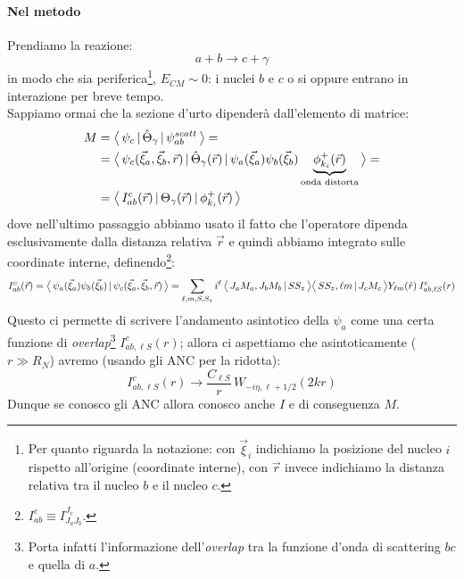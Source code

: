 \paragraph{Nel metodo}
Prendiamo la reazione:
$$a + b \to c+\gamma$$
in modo che sia periferica\footnote{Per quanto riguarda la notazione: con $\vec{\xi}_i$ indichiamo la posizione del nucleo $i$ rispetto all'origine (coordinate interne), con $\vec{r}$ invece indichiamo la distanza relativa tra il nucleo $b$ e il nucleo $c$.}, $E_{CM}\sim 0$: i nuclei $b$ e $c$ o si  oppure entrano in interazione per breve tempo.\\ 
Sappiamo ormai che la sezione d'urto dipenderà dall'elemento di matrice:
\begin{align*}
	M 
	&= \bigl\langle\, \psi_c\, |\,\hat{\Theta}_\gamma\, |\,\psi_{ab}^{scatt}\, \bigr\rangle =\\
	&= \bigl\langle\, \psi_c (\vec{\xi}_a,\vec{\xi}_b,\vec{r})\, |\,\hat{\Theta}_\gamma (	\vec{r})\, |\,\psi_{a}(\vec{\xi}_a)\psi_b(\vec{\xi}_b)\underbrace{\phi^+_{k_i}(\vec{r})}_\text{onda distorta}\, \bigr\rangle =\\ 
	&= \bigl\langle\, I_{ab}^c(\vec{r})\, |\,\Theta_\gamma(\vec{r})\, |\,\phi^+_{k_i}(\vec{r})\, \bigr\rangle
\end{align*}
dove nell'ultimo passaggio abbiamo usato il fatto che l'operatore dipenda esclusivamente dalla distanza relativa $\vec{r}$ e quindi abbiamo integrato sulle coordinate interne, definendo\footnote{$I_{ab}^c \equiv I_{J_a J_b}^{J_c}$.}:
$$
I_{ab}^c (\vec{r}) = \bigl\langle\, \psi_a(\vec{\xi}_a)\psi_b(\vec{\xi}_b)\, |\, \psi_c(\vec{\xi}_a,\vec{\xi}_b,\vec{r})\, \bigr\rangle = \sum_{\ell,m,S,S_z} i^\ell \, \bigl\langle\, J_a M_a,J_b M_b\, |\, SS_z\, \bigr\rangle \bigl\langle\, SS_z, \ell m\, |\, J_c M_c\, \bigr\rangle Y_{\ell m}(\hat{r})\:I_{ab,\ell S}^c (r)
$$
Questo ci permette di scrivere l'andamento asintotico della $\psi_a$ come una certa funzione di \textit{overlap}\footnote{Porta infatti l'informazione dell'\textit{overlap} tra la funzione d'onda di scattering $bc$ e quella di $a$.} $I_{ab,\ell S}^c (r)$; allora ci aspettiamo che asintoticamente ($r\gg R_N$) avremo (usando gli ANC per la ridotta):
$$I_{ab,\ell S}^c (r) \to \frac{C_{\ell S}}{r} \, W_{-i\eta,\ell+1/2} (2kr)$$%
Dunque se conosco gli ANC allora conosco anche $I$ e di conseguenza $M$.

